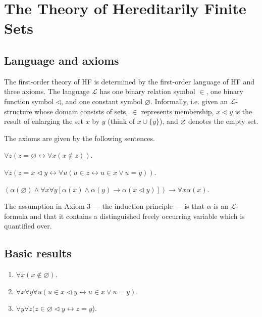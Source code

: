 \chapter{The Theory of Hereditarily Finite Sets}

\section{Language and axioms}

The first-order theory of HF is determined by the first-order language of HF and three axioms.
The language $\mathcal{L}$ has one binary relation symbol $\in$, one binary function symbol $\lhd$, 
and one constant symbol $\varnothing$.
Informally, i.e. given an $\mathcal{L}$-structure whose domain consists of sets,  
$\in$ represents membership, $x \lhd y$ is the result of enlarging the set $x$ by $y$ 
(think of $x \cup \{y\}$), and $\varnothing$ denotes the empty set.

The axioms are given by the following sentences.

\begin{axiom}
    \label{ax:empty}
    \leanok
    $\forall z (z=\varnothing \leftrightarrow \forall x(x \notin z))$.
\end {axiom}

\begin{axiom}
    \label{ax:enlarge}
    \leanok
    $\forall z (z=x \lhd y \leftrightarrow \forall u(u \in z \leftrightarrow u \in x \lor u=y))$.
\end {axiom}

\begin{axiom}
    \label{ax:induction}
    \leanok
    $(\alpha(\varnothing) \land \forall x \forall y[\alpha(x) \land \alpha(y) \rightarrow 
    \alpha(x \lhd y)]) \rightarrow \forall x \alpha(x)$.
\end {axiom}

The assumption in Axiom 3 — the induction principle — is that $\alpha$ is an $\mathcal{L}$-formula
and that it contains a distinguished freely occurring variable which is quantified over.

\section{Basic results}

\begin{lemma}
    \label{lem:notin_empty+mem_enlarge+mem_enlarge_empty}
    \leanok
    \leavevmode
    \begin{enumerate}
        \item $\forall x (x\notin \varnothing)$.
        \item $\forall x \forall y \forall u (u \in x \lhd y \leftrightarrow u \in x \lor u=y)$.
        \item $\forall y \forall z (z\in \varnothing \lhd y \leftrightarrow z = y$).
    \end{enumerate}
\end{lemma}

